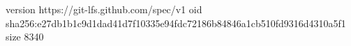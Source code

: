 version https://git-lfs.github.com/spec/v1
oid sha256:e27db1b1c9d1dad41d7f10335e94fdc72186b84846a1cb510fd9316d4310a5f1
size 8340
